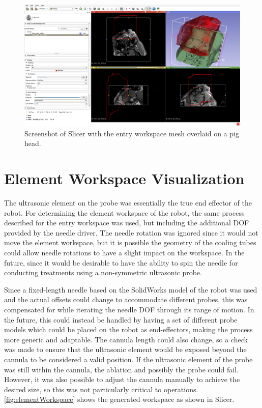 \documentclass[12pt]{report}
\begin{document}
\begin{figure}[thpb]
	\centering
	\includegraphics[width=\textwidth]{images/slicer_entry_workspace}
    \caption{Screenshot of Slicer with the entry workspace mesh overlaid on a pig head.}
    \label{fig:entryWorkspace}
\end{figure}


\section{Element Workspace Visualization}
The ultrasonic element on the probe was essentially the true end effector of the robot. For determining the element workspace of the robot, the same process described for the entry workspace was used, but including the additional DOF provided by the needle driver. The needle rotation was ignored since it would not move the element workspace, but it is possible the geometry of the cooling tubes could allow needle rotations to have a slight impact on the workspace. In the future, since it would be desirable to have the ability to spin the needle for conducting treatments using a non-symmetric ultrasonic probe. 

Since a fixed-length needle based on the SolidWorks model of the robot was used and the actual offsets could change to accommodate different probes, this was compensated for while iterating the needle DOF through its range of motion. In the future, this could instead be handled by having a set of different probe models which could be placed on the robot as end-effectors, making the process more generic and adaptable. The cannula length could also change, so a check was made to ensure that the ultrasonic element would be exposed beyond the cannula to be considered a valid position. If the ultrasonic element of the probe was still within the cannula, the ablation and possibly the probe could fail. However, it was also possible to adjust the cannula manually to achieve the desired size, so this was not particularly critical to operations. \autoref{fig:elementWorkspace} shows the generated workspace as shown in Slicer.
\end{document}

